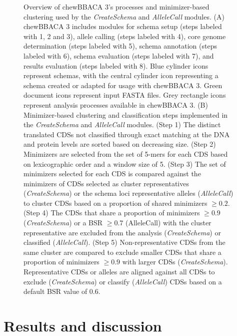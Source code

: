 \begin{figure}[h!]
    \caption[Overview of chewBBACA 3’s processes and minimizer-based clustering used by the \textit{CreateSchema} and \textit{AlleleCall} modules.]{Overview of chewBBACA 3’s processes and minimizer-based clustering used by the \textit{CreateSchema} and \textit{AlleleCall} modules. (A) chewBBACA 3 includes modules for schema setup (steps labeled with 1, 2 and 3), allele calling (steps labeled with 4), core genome determination (steps labeled with 5), schema annotation (steps labeled with 6), schema evaluation (steps labeled with 7), and results evaluation (steps labeled with 8). Blue cylinder icons represent schemas, with the central cylinder icon representing a schema created or adapted for usage with chewBBACA 3. Green document icons represent input FASTA files. Grey rectangle icons represent analysis processes available in chewBBACA 3. (B) Minimizer-based clustering and classification steps implemented in the \textit{CreateSchema} and \textit{AlleleCall} modules. (Step 1) The distinct translated \ac{CDSs} not classified through exact matching at the \ac{DNA} and protein levels are sorted based on decreasing size. (Step 2) Minimizers are selected from the set of 5-mers for each \ac{CDS} based on lexicographic order and a window size of 5. (Step 3) The set of minimizers selected for each \ac{CDS} is compared against the minimizers of \ac{CDSs} selected as cluster representatives (\textit{CreateSchema}) or the schema loci representative alleles (\textit{AlleleCall}) to cluster \ac{CDSs} based on a proportion of shared minimizers $\geq0.2$. (Step 4) The \ac{CDSs} that share a proportion of minimizers $\geq0.9$ (\textit{CreateSchema}) or a \ac{BSR} $\geq0.7$ (AlleleCall) with the cluster representative are excluded from the analysis (\textit{CreateSchema}) or classified (\textit{AlleleCall}). (Step 5) Non-representative \ac{CDSs} from the same cluster are compared to exclude smaller \ac{CDSs} that share a proportion of minimizers $\geq0.9$ with larger \ac{CDSs} (\textit{CreateSchema}). Representative \ac{CDSs} or alleles are aligned against all \ac{CDSs} to exclude (\textit{CreateSchema}) or classify (\textit{AlleleCall}) \ac{CDSs} based on a default \ac{BSR} value of 0.6.}\label{fig:chap2_figure1_legend}
\end{figure}

\section{Results and discussion} \label{sec:ch2_results_and_discussion}

